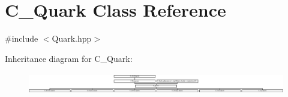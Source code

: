 \hypertarget{class_c___quark}{\section{C\-\_\-\-Quark Class Reference}
\label{class_c___quark}
}


{\ttfamily \#include $<$Quark.\-hpp$>$}

Inheritance diagram for C\-\_\-\-Quark\-:\begin{figure}[H]
\begin{center}
\leavevmode
\includegraphics[height=0.957265cm]{class_c___quark}
\end{center}
\end{figure}
